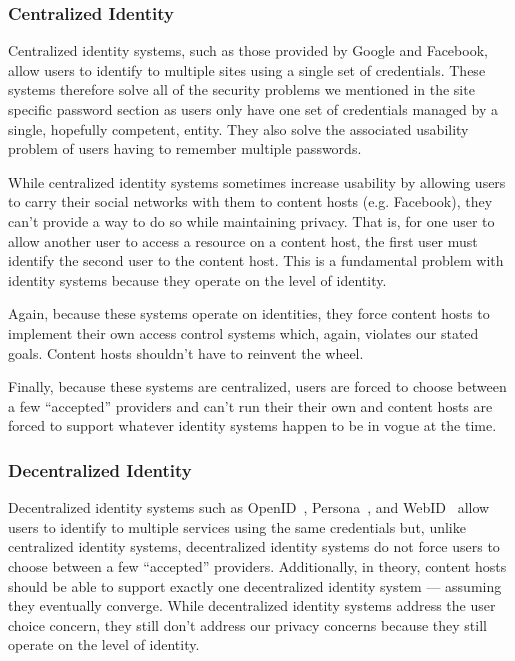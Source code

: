 \documentclass[pdftex,12pt,a4papaer]{report}
\begin{document}
\subsubsection{Centralized Identity}

Centralized identity systems, such as those provided by Google and Facebook,
allow users to identify to multiple sites using a single set of credentials.
These systems therefore solve all of the security problems we mentioned in the
site specific password section as users only have one set of credentials managed
by a single, hopefully competent, entity. They also solve the associated
usability problem of users having to remember multiple passwords.

While centralized identity systems sometimes increase usability by allowing
users to carry their social networks with them to content hosts (e.g. Facebook),
they can't provide a way to do so while maintaining privacy. That is, for one
user to allow another user to access a resource on a content host, the first
user must identify the second user to the content host. This is a fundamental
problem with identity systems because they operate on the level of identity.

Again, because these systems operate on identities, they force content hosts to
implement their own access control systems which, again, violates our stated
goals. Content hosts shouldn't have to reinvent the wheel.

Finally, because these systems are centralized, users are forced to choose
between a few ``accepted'' providers and can't run their their own and content
hosts are forced to support whatever identity systems happen to be in vogue at
the time.

\subsubsection{Decentralized Identity}

Decentralized identity systems such as OpenID~\cite{openid},
Persona~\cite{persona}, and WebID~\cite{webid} allow users to identify to
multiple services using the same credentials but, unlike centralized identity
systems, decentralized identity systems do not force users to choose between a
few ``accepted'' providers. Additionally, in theory, content hosts should be
able to support exactly one decentralized identity system --- assuming they
eventually converge. While decentralized identity systems address the user
choice concern, they still don't address our privacy concerns because they still
operate on the level of identity.
\end{document}
